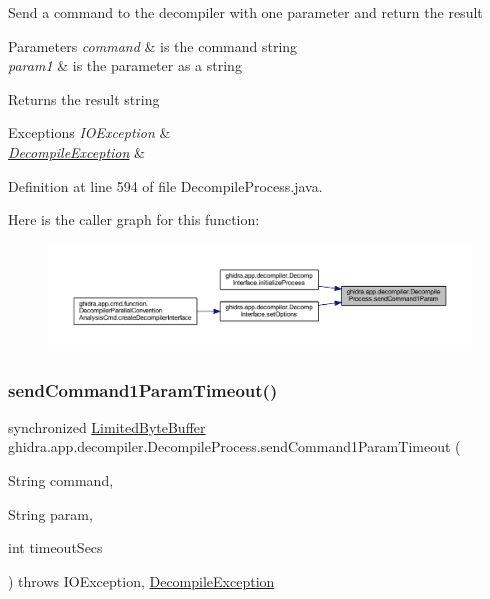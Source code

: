 Send a command to the decompiler with one parameter and return the result 
\begin{DoxyParams}{Parameters}
{\em command} & is the command string \\
\hline
{\em param1} & is the parameter as a string \\
\hline
\end{DoxyParams}
\begin{DoxyReturn}{Returns}
the result string 
\end{DoxyReturn}

\begin{DoxyExceptions}{Exceptions}
{\em I\+O\+Exception} & \\
\hline
{\em \mbox{\hyperlink{classghidra_1_1app_1_1decompiler_1_1_decompile_exception}{Decompile\+Exception}}} & \\
\hline
\end{DoxyExceptions}


Definition at line 594 of file Decompile\+Process.\+java.

Here is the caller graph for this function\+:
\nopagebreak
\begin{figure}[H]
\begin{center}
\leavevmode
\includegraphics[width=350pt]{classghidra_1_1app_1_1decompiler_1_1_decompile_process_a07d6213d3257b394022e7b8d13a3746e_icgraph}
\end{center}
\end{figure}
\mbox{\label{classghidra_1_1app_1_1decompiler_1_1_decompile_process_a4091afccee2689876c3426cb8c6b663c}} 
\subsubsection{\texorpdfstring{sendCommand1ParamTimeout()}{sendCommand1ParamTimeout()}}
{\footnotesize\ttfamily synchronized \mbox{\hyperlink{classghidra_1_1app_1_1decompiler_1_1_limited_byte_buffer}{Limited\+Byte\+Buffer}} ghidra.\+app.\+decompiler.\+Decompile\+Process.\+send\+Command1\+Param\+Timeout (\begin{DoxyParamCaption}\item[{String}]{command,  }\item[{String}]{param,  }\item[{int}]{timeout\+Secs }\end{DoxyParamCaption}) throws I\+O\+Exception, \mbox{\hyperlink{classghidra_1_1app_1_1decompiler_1_1_decompile_exception}{Decompile\+Exception}}\hspace{0.3cm}{\ttfamily [inline]}}


